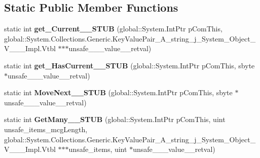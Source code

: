 \subsection*{Static Public Member Functions}
\begin{DoxyCompactItemize}
\item 
\mbox{\label{struct_windows_1_1_foundation_1_1_collections_1_1_i_iterator___a___system___collections___generi1b6291336687b5a660c835303ec8be78_aadf6d332db165cca1e70267f291259b4}} 
static int {\bfseries get\+\_\+\+Current\+\_\+\+\_\+\+S\+T\+UB} (global\+::\+System.\+Int\+Ptr p\+Com\+This, global\+::\+System.\+Collections.\+Generic.\+Key\+Value\+Pair\+\_\+\+A\+\_\+string\+\_\+j\+\_\+\+System\+\_\+\+Object\+\_\+\+V\+\_\+\+\_\+\+\_\+\+Impl.\+Vtbl $\ast$$\ast$$\ast$unsafe\+\_\+\+\_\+\+\_\+value\+\_\+\+\_\+retval)
\item 
\mbox{\label{struct_windows_1_1_foundation_1_1_collections_1_1_i_iterator___a___system___collections___generi1b6291336687b5a660c835303ec8be78_add443a06ecf2aa75d8bab2ead931996f}} 
static int {\bfseries get\+\_\+\+Has\+Current\+\_\+\+\_\+\+S\+T\+UB} (global\+::\+System.\+Int\+Ptr p\+Com\+This, sbyte $\ast$unsafe\+\_\+\+\_\+\+\_\+value\+\_\+\+\_\+retval)
\item 
\mbox{\label{struct_windows_1_1_foundation_1_1_collections_1_1_i_iterator___a___system___collections___generi1b6291336687b5a660c835303ec8be78_a068db25123b46e77d725ebee9129c322}} 
static int {\bfseries Move\+Next\+\_\+\+\_\+\+S\+T\+UB} (global\+::\+System.\+Int\+Ptr p\+Com\+This, sbyte $\ast$unsafe\+\_\+\+\_\+\+\_\+value\+\_\+\+\_\+retval)
\item 
\mbox{\label{struct_windows_1_1_foundation_1_1_collections_1_1_i_iterator___a___system___collections___generi1b6291336687b5a660c835303ec8be78_a851195ff937680d7755e089305f881be}} 
static int {\bfseries Get\+Many\+\_\+\+\_\+\+S\+T\+UB} (global\+::\+System.\+Int\+Ptr p\+Com\+This, uint unsafe\+\_\+items\+\_\+mcg\+Length, global\+::\+System.\+Collections.\+Generic.\+Key\+Value\+Pair\+\_\+\+A\+\_\+string\+\_\+j\+\_\+\+System\+\_\+\+Object\+\_\+\+V\+\_\+\+\_\+\+\_\+\+Impl.\+Vtbl $\ast$$\ast$$\ast$unsafe\+\_\+items, uint $\ast$unsafe\+\_\+\+\_\+\+\_\+value\+\_\+\+\_\+retval)

\end{DoxyCompactItemize}
